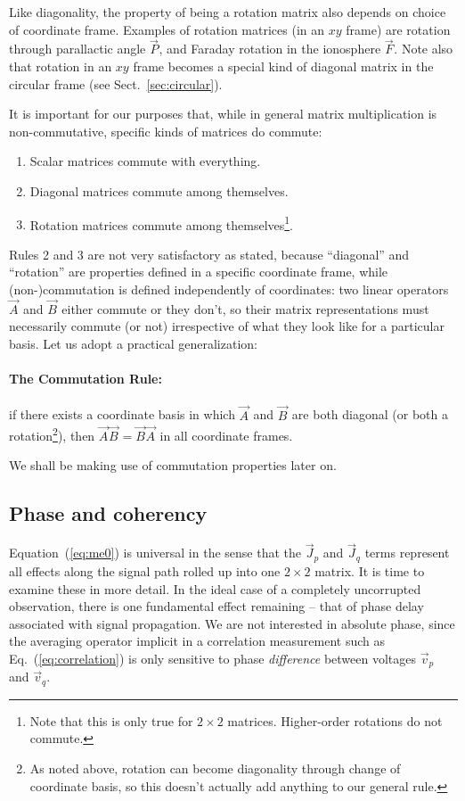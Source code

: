 \documentclass{aa}
\newcommand{\jones}[2]{\vec {#1}_{#2}}
\begin{document}
Like diagonality, the property of being a rotation matrix also depends on choice of coordinate frame. Examples of rotation matrices (in an $xy$ frame) are rotation through parallactic angle $\jones{P}{}$, and Faraday rotation in the ionosphere $\jones{F}{}$. Note also that rotation in an $xy$ frame becomes a special kind of diagonal matrix in the circular frame (see Sect.~\ref{sec:circular}).

It is important for our purposes that, while in general matrix multiplication is non-commutative, specific kinds of matrices do commute:

\begin{enumerate}
\item Scalar matrices commute with everything.
\item Diagonal matrices commute among themselves.
\item Rotation matrices commute among themselves\footnote{Note that this is only true for $2\times2$ matrices. Higher-order rotations do not commute.}.
\end{enumerate}

Rules 2 and 3 are not very satisfactory as stated, because ``diagonal'' and ``rotation'' are properties defined in a specific coordinate frame, while (non-)commutation is defined independently of coordinates: two linear operators $\jones{A}{}$ and $\jones{B}{}$ either commute or they don't, so their matrix representations must necessarily commute (or not) irrespective of what they look like for a particular basis. Let us adopt a practical generalization: 

\paragraph{The Commutation Rule:} if there exists a coordinate basis in which $\jones{A}{}$ and $\jones{B}{}$ are both diagonal (or both a rotation\footnote{As noted above, rotation can become diagonality through change of coordinate basis, so this doesn't actually add anything to our general rule.}), then $\jones{A}{} \jones{B}{}=\jones{B}{}\jones{A}{}$ in all coordinate frames. 

We shall be making use of commutation properties later on.

\subsection{\label{sec:coherency}Phase and coherency}

Equation~(\ref{eq:me0}) is universal in the sense that the $\jones{J}{p}$ and $\jones{J}{q}$ terms represent all effects along the signal path rolled up into one $2\times2$ matrix. It is time to examine these in more detail. In the ideal case of a completely uncorrupted observation, there is one fundamental effect remaining -- that of phase delay associated with signal propagation. We are not interested in absolute phase, since the averaging operator implicit in a correlation measurement such as Eq.~(\ref{eq:correlation}) is only sensitive to phase {\em difference} between voltages $\vec v_p$ and $\vec v_q$. 
\end{document}
